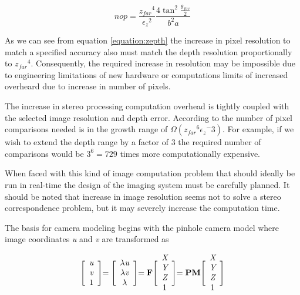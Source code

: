 \documentclass[12pt,a4paper,oneside,pdftex]{report}
\begin{document}
\begin{equation}
nop = \frac{{z_{far}}^4}{{\epsilon_z}^2} \frac{4\tan^2{\frac{\theta_{fov}}{2}}}{b^2 a}
\label{equation:zdepth}
\end{equation}

As we can see from equation \ref{equation:zepth} the increase in pixel resolution to match a specified accuracy also must match the depth resolution proportionally to ${z_{far}}^4$. Consequently, the required increase in resolution may be impossible due to engineering limitations of new hardware or computations limits of increased overheard due to increase in number of pixels.

The increase in stereo processing computation overhead is tightly coupled with the selected image resolution and depth error. According to \cite{Gallup08} the number of pixel comparisons needed is in the growth range of $ \Omega({z_{far}}^6 {\epsilon_z}^-3)$. For example, if we wish to extend the depth range by a factor of 3 the required number of comparisons would be $3^6 = 729$ times more computationally expensive.

When faced with this kind of image computation problem that should ideally be run in real-time the design of the imaging system must be carefully planned. It should be noted that increase in image resolution seems not to solve a stereo correspondence problem, but it may severely increase the computation time. 

The basis for camera modeling begins with the pinhole camera model where image coordinates \emph{u} and \emph{v} are transformed as

\begin{equation}
\Biggl[ \begin{array}{c}
\emph{u} \\
\emph{v} \\
1 \end{array} \Biggl]
= \Biggl[ \begin{array}{c}
\lambda \emph{u} \\
\lambda \emph{v} \\
\lambda \end{array} \Biggl]
= \textbf{F}\Biggl[ \begin{array}{c}
\emph{X} \\
\emph{Y} \\
\emph{Z} \\
1 \end{array} \Biggl]
= \textbf{PM} \Biggl[ \begin{array}{c} 
\emph{X} \\
\emph{Y} \\
\emph{Z} \\
1 \end{array} \Biggl]
\end{equation}
\end{document}
